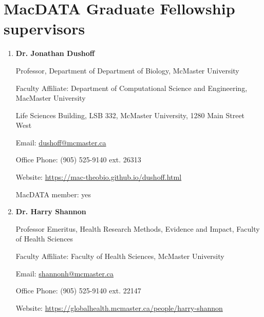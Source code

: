 \section{MacDATA Graduate Fellowship supervisors}

\begin{enumerate}

\item \textbf{Dr. Jonathan Dushoff}

Professor, Department of Department of Biology, McMaster University

Faculty Affiliate: Department of Computational Science and Engineering, MacMaster University

Life Sciences Building, LSB 332, McMaster University, 1280 Main Street West

Email: \href{mailto:dushoff@mcmaster.ca}{dushoff@mcmaster.ca}

Office Phone: (905) 525-9140 ext. 26313

Website: \href{https://mac-theobio.github.io/dushoff.html}{https://mac-theobio.github.io/dushoff.html}

MacDATA member: yes

\item \textbf{Dr. Harry Shannon}

Professor Emeritus, Health Research Methods, Evidence and Impact, Faculty of Health Sciences

Faculty Affiliate: Faculty of Health Sciences, McMaster University

Email: \href{mailto:shannonh@mcmaster.ca}{shannonh@mcmaster.ca}

Office Phone: (905) 525-9140 ext. 22147

Website: \href{https://globalhealth.mcmaster.ca/people/harry-shannon}{https://globalhealth.mcmaster.ca/people/harry-shannon}
\end{enumerate}

